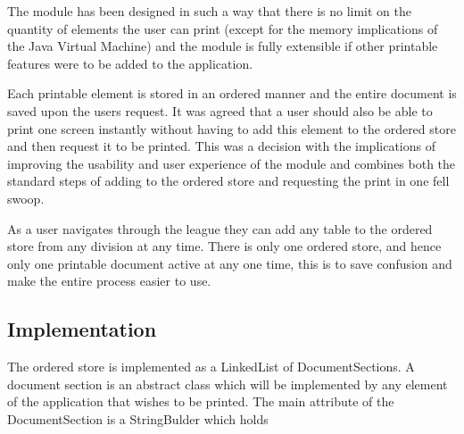 The module has been designed in such a way that there is no limit on
the quantity of elements the user can print (except for the memory
implications of the Java Virtual Machine) and the module is fully
extensible if other printable features were to be added to the
application. 

Each printable element is stored in an ordered manner and
the entire document is saved upon the users request. It was agreed
that a user should also be able to print one screen instantly without
having to add this element to the ordered store and then request it to
be printed. This was a decision with the implications of improving the
usability and user experience of the module and combines both the
standard steps of adding to the ordered store and requesting the print
in one fell swoop.

As a user navigates through the league they can add any table to the
ordered store from any division at any time. There is only one ordered
store, and hence only one printable document active at any one time,
this is to save confusion and make the entire process easier to use.

\subsection{Implementation}

The ordered store is implemented as a LinkedList of
DocumentSections. A document section is an abstract class which will
be implemented by any element of the application that wishes to be
printed. The main attribute of the DocumentSection is a StringBulder
which holds
